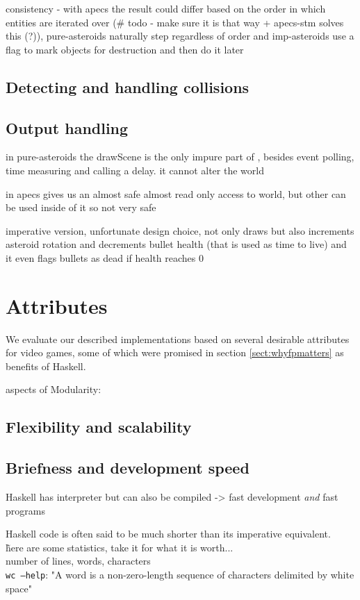 \documentclass[
  digital, %
  color,   %
  table,   %
  oneside, %
  lof,     %
  lot,     %
]{fithesis3}
\begin{document}
{consistency - with apecs the result could differ based on the order in which
entities are iterated over (\# todo - make sure it is that way + apecs-stm solves this (?)),
pure-asteroids naturally step regardless of order and imp-asteroids use a flag to mark
objects for destruction and then do it later

\subsection*{Detecting and handling collisions}



\subsection*{Output handling}

in pure-asteroids the drawScene is the only impure part of ,
besides event polling, time measuring and calling a delay. it cannot alter the world

in apecs  gives us an almost safe almost read only access to world,
but other  can be used inside of it so not very safe

imperative version, unfortunate design choice,  not only draws
but also increments asteroid rotation and decrements bullet health (that is used as time to live)
and it even flags bullets as dead if health reaches 0

\section{Attributes}
We evaluate our described implementations based on several desirable attributes for video games,
some of which were promised in section \ref{sect:whyfpmatters} as benefits of Haskell.

aspects of Modularity:
\subsection*{Flexibility and scalability}


\subsection*{Briefness and development speed}

Haskell has interpreter but can also be compiled -> fast development \emph{and} fast programs

Haskell code is often said to be much shorter than its imperative equivalent.\\
\~here are some statistics, take it for what it is worth...\~\\
number of lines, words, characters\\
\texttt{wc --help}: "A word is a non-zero-length sequence of characters delimited by white space"\\

}
\end{document}
